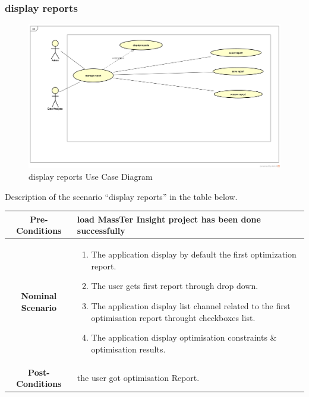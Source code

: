 \documentclass[12pt]{article}
\begin{document}
	 \subsubsection{display reports}
	 	\begin{figure}[h]
	 	\centering
	 	\includegraphics[width=1.0\textwidth]{manageReport.png}
	 	\caption{display reports Use Case Diagram}
	 	
	 \end{figure}
  Description of the scenario ``display reports'' in the table below.
  
   \begin{table}
  	\centering
  	\begin{tabular}{|c|p{10cm}|}
  		\hline 	
  		\textbf{Pre-Conditions } & load MassTer Insight project has been done successfully  \\ 
  		\hline                     
  		\textbf{Nominal Scenario } &
  		\begin{enumerate}
  			\item The application display by default the first optimization report.
  			\item The user gets first report through drop down.
  			\item The application display list channel related to the first optimisation report throught checkboxes list.
  			\item The application display optimisation constraints \& optimisation results. 
 
  	   	\end{enumerate} \\ 
  		\hline 
  		\textbf{Post-Conditions} & the user got optimisation Report. \\
  		\hline 
  	\end{tabular}
  \end{table}
\end{document}
